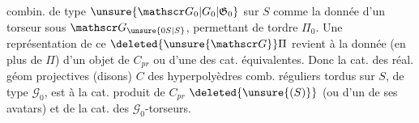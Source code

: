 combin. de type $\unsure{\mathscr G_0|G_0|\mathfrak G_0}$ sur $S$ comme la donnée d'un torseur  sous $\mathscr G_{\unsure{0S|S}}$, permettant de tordre $\Pi_0$. Une représentation de ce $\deleted{\unsure{\mathscr G}}\Pi$ revient à la donnée (en plus de $\Pi$) d'un objet de $C_{pr}$ ou d'une des cat. équivalentes. Donc la cat. des réal. géom projectives (disons)  $C$ des hyperpolyèdres comb. réguliers tordus sur $S$, de type $\mathscr G_0$, est  à la cat. produit de $C_{pr}$ $\deleted{\unsure{(S)}}$ (ou d'un de ses avatars) et de la cat. des $\mathscr G_0$-torseurs.



